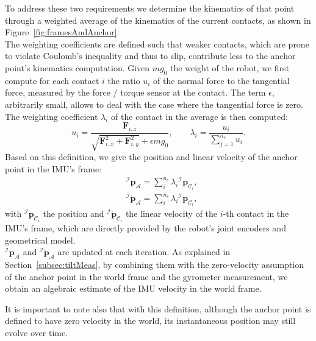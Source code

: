 \documentclass{IJCAS}
\begin{document}
To address these two requirements we determine the kinematics of that point through a weighted average of the kinematics of the current contacts, as shown in Figure~\ref{fig:framesAndAnchor}.  \\
The weighting coefficients are defined such that weaker contacts, which are prone to violate Coulomb's inequality and thus to slip, contribute less to the anchor point's kinematics computation. Given $mg_{0}$ the weight of the robot, we first compute for each contact $i$ the ratio $u_{i}$ of the normal force to the tangential force, measured by the force / torque sensor at the contact. The term $\epsilon$, arbitrarily small, allows to deal with the case where the tangential force is zero. The weighting coefficient $\lambda_{i}$ of the contact in the average is then computed:
\begin{equation}
    u_{i} = \frac{\boldsymbol{F}_{i,z}}{\sqrt{\boldsymbol{F}_{i,x}^2 + \boldsymbol{F}_{i,y}^2} + \epsilon mg_{0}}, \qquad \lambda_{i}=\frac{u_{i}}{\sum^{n_{c}}_{j=1}u_{i}}. \label{eq:ratio_ui}
\end{equation}
Based on this definition, we give the position and linear velocity of the anchor point in the IMU's frame:
\begin{align} 
&{^{\mathcal{I}}}\boldsymbol{p}_{\mathcal{A}} = \sum^{n_{c}}_{i} \lambda_{i}  {^{\mathcal{I}}} \boldsymbol{p}_{{\mathcal{C}}_{i}}, \label{eq:imuAnchorPos} \\
&{^{\mathcal{I}}} \dot{\boldsymbol{p}}_{\mathcal{A}} = \sum^{n_{c}}_{i} \lambda_{i}  {^{\mathcal{I}}} \dot{\boldsymbol{p}}_{{\mathcal{C}}_{i}}, \label{eq:imuAnchorVel}
\end{align} 
with ${^{\mathcal{I}}} \boldsymbol{p}_{{\mathcal{C}}_{i}}$ the position and ${^{\mathcal{I}}} \dot{\boldsymbol{p}}_{{\mathcal{C}}_{i}}$ the linear velocity of the $i$-th contact in the IMU's frame, which are directly provided by the robot's joint encoders and geometrical model. \\${^{\mathcal{I}}}\boldsymbol{p}_{\mathcal{A}}$ and ${^{\mathcal{I}}} \dot{\boldsymbol{p}}_{\mathcal{A}}$ are updated at each iteration. As explained in Section~\ref{subsec:tiltMeas}, by combining them with the zero-velocity assumption of the anchor point in the world frame and the gyrometer measurement, we obtain an algebraic estimate of the IMU velocity in the world frame.

It is important to note also that with this definition, although the anchor point is defined to have zero velocity in the world, its instantaneous position may still evolve over time.
\end{document}
